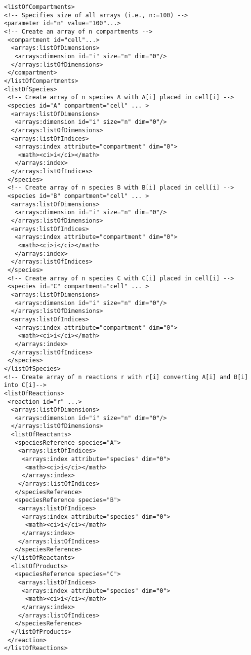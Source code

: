 \begin{verbatim}
<listOfCompartments> 
<!-- Specifies size of all arrays (i.e., n:=100) -->
<parameter id="n" value="100"...>
<!-- Create an array of n compartments -->
 <compartment id="cell"...>
  <arrays:listOfDimensions>
   <arrays:dimension id="i" size="n" dim="0"/>
  </arrays:listOfDimensions>
 </compartment>
</listOfCompartments> 
<listOfSpecies>
 <!-- Create array of n species A with A[i] placed in cell[i] -->
 <species id="A" compartment="cell" ... > 
  <arrays:listOfDimensions>
   <arrays:dimension id="i" size="n" dim="0"/>
  </arrays:listOfDimensions>
  <arrays:listOfIndices>
   <arrays:index attribute="compartment" dim="0">
    <math><ci>i</ci></math>
   </arrays:index>
  </arrays:listOfIndices>
 </species>
 <!-- Create array of n species B with B[i] placed in cell[i] -->
 <species id="B" compartment="cell" ... > 
  <arrays:listOfDimensions>
   <arrays:dimension id="i" size="n" dim="0"/>
  </arrays:listOfDimensions>
  <arrays:listOfIndices>
   <arrays:index attribute="compartment" dim="0">
    <math><ci>i</ci></math>
   </arrays:index>
  </arrays:listOfIndices>
 </species>
 <!-- Create array of n species C with C[i] placed in cell[i] -->
 <species id="C" compartment="cell" ... >
  <arrays:listOfDimensions>
   <arrays:dimension id="i" size="n" dim="0"/>
  </arrays:listOfDimensions>
  <arrays:listOfIndices>
   <arrays:index attribute="compartment" dim="0">
    <math><ci>i</ci></math>
   </arrays:index>
  </arrays:listOfIndices>
 </species>
</listOfSpecies>
<!-- Create array of n reactions r with r[i] converting A[i] and B[i] into C[i]-->
<listOfReactions>
 <reaction id="r" ...> 
  <arrays:listOfDimensions>
   <arrays:dimension id="i" size="n" dim="0"/>
  </arrays:listOfDimensions>
  <listOfReactants>
   <speciesReference species="A">
    <arrays:listOfIndices>
     <arrays:index attribute="species" dim="0">
      <math><ci>i</ci></math>
     </arrays:index>
    </arrays:listOfIndices>
   </speciesReference>
   <speciesReference species="B"> 
    <arrays:listOfIndices>
     <arrays:index attribute="species" dim="0">
      <math><ci>i</ci></math>
     </arrays:index>
    </arrays:listOfIndices>
   </speciesReference>
  </listOfReactants> 
  <listOfProducts>
   <speciesReference species="C"> 
    <arrays:listOfIndices>
     <arrays:index attribute="species" dim="0">
      <math><ci>i</ci></math>
     </arrays:index>
    </arrays:listOfIndices>
   </speciesReference>
  </listOfProducts>
 </reaction>
</listOfReactions>
\end{verbatim}

